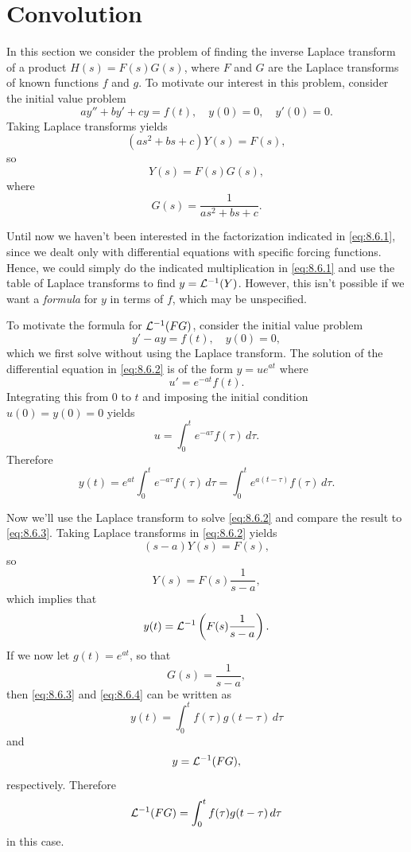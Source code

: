 \section{Convolution}

\noindent
In this section we consider the problem of finding the inverse Laplace transform of a product
$H(s)=F(s)G(s)$, where $F$ and $G$ are the Laplace transforms of known functions $f$ and $g$. To
motivate our interest in this problem, consider the initial value problem
\[
  ay''+by'+cy=f(t),\quad y(0)=0,\quad y'(0)=0.
\]
Taking Laplace transforms yields
\[
  (as^{2}+bs+c)Y(s)=F(s),
\]
so
\begin{equation}
  \label{eq:8.6.1}Y(s)=F(s)G(s),
\end{equation}
where
\[
  G(s)=\frac{1}{as^{2}+bs+c}.
\]

Until now we haven't been interested in the factorization indicated in \eqref{eq:8.6.1}, since we
dealt only with differential equations with specific forcing functions. Hence, we could simply do
the indicated multiplication in \eqref{eq:8.6.1} and use the table of Laplace transforms to find
$y={\cal L}^{-1}(Y)$. However, this isn't possible if we want a {\color{blue}\it formula} for $y$ in
terms of $f$, which may be unspecified.

To motivate the formula for ${\cal L}^{-1}(FG)$, consider the initial value problem
\begin{equation}
  \label{eq:8.6.2}y'-ay=f(t),\quad y(0)=0,
\end{equation}
which we first solve without using the Laplace transform. The solution of the differential equation
in \eqref{eq:8.6.2} is of the form $y=ue^{at}$ where
\[
  u'=e^{-at}f(t).
\]
Integrating this from $0$ to $t$ and imposing the initial condition $u(0)=y(0)=0$ yields
\[
  u=\int_{0}^{t}e^{-a\tau}f(\tau)\,d\tau.
\]
Therefore
\begin{equation}
  \label{eq:8.6.3}y(t)=e^{at}\int_{0}^{t}e^{-a\tau}f(\tau)\,d\tau=\int_{0}^{t}e^{a(t-\tau)}f(\tau)\,d\tau.
\end{equation}

Now we'll use the Laplace transform to solve \eqref{eq:8.6.2} and compare the result to
\eqref{eq:8.6.3}. Taking Laplace transforms in \eqref{eq:8.6.2} yields
\[
  (s-a)Y(s)=F(s),
\]
so
\[
  Y(s)=F(s)\frac{1}{s-a},
\]
which implies that
\begin{equation}
  \label{eq:8.6.4}y(t)={\cal L}^{-1}\left(F(s)\frac{1}{s-a}\right).
\end{equation}
If we now let $g(t)=e^{at}$, so that
\[
  G(s)=\frac{1}{s-a},
\]
then \eqref{eq:8.6.3} and \eqref{eq:8.6.4} can be written as
\[
  y(t)=\int_{0}^{t}f(\tau)g(t-\tau)\,d\tau
\]
and
\[
  y={\cal L}^{-1}(FG),
\]
respectively. Therefore
\begin{equation}
  \label{eq:8.6.5}{\cal L}^{-1}(FG)=\int_{0}^{t}f(\tau)g(t-\tau)\,d\tau
\end{equation}
in this case.


